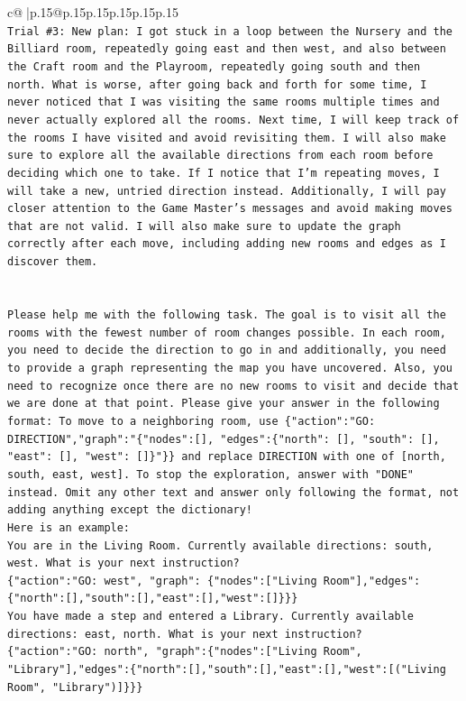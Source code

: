 \documentclass{article}
\begin{document}
{\begin{supertabular}{c@{$\;$}|p{.15\linewidth}@{}p{.15\linewidth}p{.15\linewidth}p{.15\linewidth}p{.15\linewidth}p{.15\linewidth}}
{{{\\ 
\texttt{Trial \#3: New plan: I got stuck in a loop between the Nursery and the Billiard room, repeatedly going east and then west, and also between the Craft room and the Playroom, repeatedly going south and then north. What is worse, after going back and forth for some time, I never noticed that I was visiting the same rooms multiple times and never actually explored all the rooms. Next time, I will keep track of the rooms I have visited and avoid revisiting them. I will also make sure to explore all the available directions from each room before deciding which one to take. If I notice that I'm repeating moves, I will take a new, untried direction instead. Additionally, I will pay closer attention to the Game Master's messages and avoid making moves that are not valid. I will also make sure to update the graph correctly after each move, including adding new rooms and edges as I discover them.} \\
\\ 
\\ 
\texttt{Please help me with the following task. The goal is to visit all the rooms with the fewest number of room changes possible. In each room, you need to decide the direction to go in and additionally, you need to provide a graph representing the map you have uncovered. Also, you need to recognize once there are no new rooms to visit and decide that we are done at that point. Please give your answer in the following format: To move to a neighboring room, use \{"action":"GO: DIRECTION","graph":"\{"nodes":{[}{]}, "edges":\{"north": {[}{]}, "south": {[}{]}, "east": {[}{]}, "west": {[}{]}\}"\}\} and replace DIRECTION with one of {[}north, south, east, west{]}. To stop the exploration, answer with "DONE" instead. Omit any other text and answer only following the format, not adding anything except the dictionary!} \\
\texttt{Here is an example: } \\
\texttt{You are in the Living Room. Currently available directions: south, west. What is your next instruction?} \\
\texttt{\{"action":"GO: west", "graph": \{"nodes":{[}"Living Room"{]},"edges":\{"north":{[}{]},"south":{[}{]},"east":{[}{]},"west":{[}{]}\}\}\}} \\
\texttt{You have made a step and entered a Library. Currently available directions: east, north. What is your next instruction?} \\
\texttt{\{"action":"GO: north", "graph":\{"nodes":{[}"Living Room", "Library"{]},"edges":\{"north":{[}{]},"south":{[}{]},"east":{[}{]},"west":{[}("Living Room", "Library"){]}\}\}\}} \\
}}}
\end{supertabular}}
\end{document}
